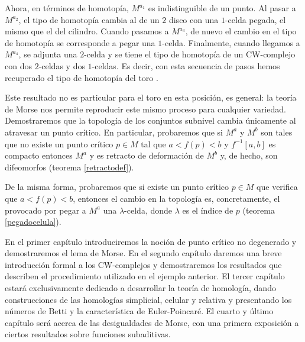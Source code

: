 Ahora, en términos de homotopía, $M^{a_1}$ es indistinguible de un punto. Al pasar a $M^{a_2}$, el tipo de homotopía cambia al de un $2$ disco con una $1$-celda pegada, el mismo que el del cilindro. Cuando pasamos a $M^{a_3}$, de nuevo el cambio en el tipo de homotopía se corresponde a pegar una $1$-celda. Finalmente, cuando llegamos a $M^{a_4}$, se adjunta una $2$-celda y se tiene el tipo de homotopía de un CW-complejo con dos $2$-celdas y dos $1$-celdas. Es decir, con esta secuencia de pasos hemos recuperado el tipo de homotopía del toro \cite{milnor1963} \cite{bott1988morse}.

Este resultado no es particular para el toro en esta posición, es general: la teoría de Morse nos permite reproducir este mismo proceso para cualquier variedad. Demostraremos que la topología de los conjuntos subnivel cambia únicamente al atravesar un punto crítico. En particular, probaremos que si $M^a$ y $M^b$ son tales que no existe un punto crítico $p\in M$ tal que $a<f(p)<b$ y $f^{-1}[a,b]$ es compacto entonces $M^a$ y es retracto de deformación de $M^b$ y, de hecho, son difeomorfos (teorema \ref{retractodef}). 

De la misma forma, probaremos que si existe un punto crítico $p\in M$ que verifica que $a<f(p)<b$, entonces el cambio en la topología es, concretamente, el provocado por pegar a $M^a$ una $\lambda$-celda, donde $\lambda$ es el índice de $p$ (teorema \ref{pegadocelula}).

\medskip


En el primer capítulo introduciremos la noción de punto crítico no degenerado y demostraremos el lema de Morse. En el segundo capítulo daremos una breve introducción formal a los CW-complejos y demostraremos los resultados que describen el procedimiento utilizado en el ejemplo anterior. El tercer capítulo estará exclusivamente dedicado a desarrollar la teoría de homología, dando construcciones de las homologías simplicial, celular y relativa y presentando los números de Betti y la característica de Euler-Poincaré. El cuarto y último capítulo será acerca de las desigualdades de Morse, con una primera exposición a ciertos resultados sobre funciones subaditivas.


